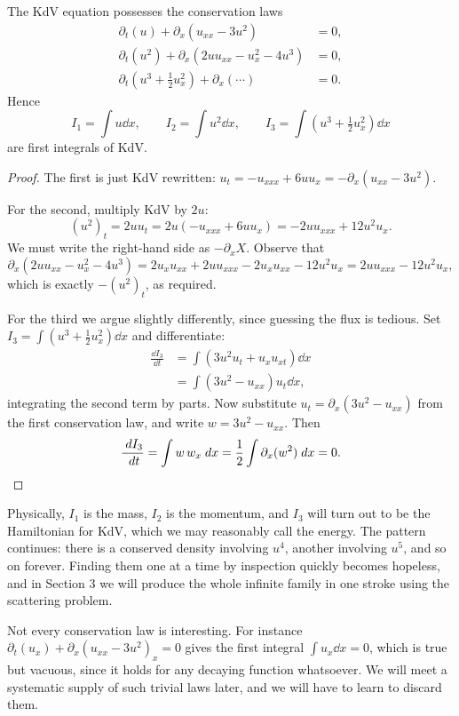 \documentclass[a4paper]{scrartcl}
\begin{document}
\begin{proposition}
	The KdV equation possesses the conservation laws
	\begin{align*}
		\partial_t(u) + \partial_x\left(u_{xx} - 3u^2\right) &= 0,\\
		\partial_t(u^2) + \partial_x\left(2uu_{xx} - u_x^2 - 4u^3\right) &= 0,\\
		\partial_t\left(u^3 + \tfrac{1}{2}u_x^2\right) + \partial_x\left(\cdots\right) &= 0.
	\end{align*}
	Hence
	$$
	I_1 = \int u \dd x, \qquad I_2 = \int u^2\dd x, \qquad I_3 = \int\left(u^3 + \tfrac{1}{2}u_x^2\right)\dd x
	$$
	are first integrals of KdV.
\end{proposition}
\begin{proof}
	The first is just KdV rewritten: $u_t = -u_{xxx} + 6uu_x = -\partial_x(u_{xx} - 3u^2)$.

	For the second, multiply KdV by $2u$:
	$$
	(u^2)_t = 2uu_t = 2u(-u_{xxx} + 6uu_x) = -2uu_{xxx} + 12u^2u_x.
	$$
	We must write the right-hand side as $-\partial_x X$. Observe that
	$$
	\partial_x(2uu_{xx} - u_x^2 - 4u^3) = 2u_xu_{xx} + 2uu_{xxx} - 2u_xu_{xx} - 12u^2u_x = 2uu_{xxx} - 12u^2u_x,
	$$
	which is exactly $-(u^2)_t$, as required.

	For the third we argue slightly differently, since guessing the flux is tedious. Set $I_3 = \int(u^3 + \frac{1}{2}u_x^2)\dd x$ and differentiate:
	\begin{align*}
		\frac{\dd I_3}{\dd t} &= \int\left(3u^2u_t + u_xu_{xt}\right)\dd x\\
		&= \int\left(3u^2 - u_{xx}\right)u_t\dd x,
	\end{align*}
	integrating the second term by parts. Now substitute $u_t = \partial_x(3u^2 - u_{xx})$ from the first conservation law, and write $w = 3u^2 - u_{xx}$. Then
	$$
	\frac{\; d I_3}{\; d t} = \int w\, w_x\; d x = \frac{1}{2}\int\partial_x(w^2)\; d x = 0. \qedhere
	$$
\end{proof}

Physically, $I_1$ is the mass, $I_2$ is the momentum, and $I_3$ will turn out to be the Hamiltonian for KdV, which we may reasonably call the energy. The pattern continues: there is a conserved density involving $u^4$, another involving $u^5$, and so on forever. Finding them one at a time by inspection quickly becomes hopeless, and in Section 3 we will produce the whole infinite family in one stroke using the scattering problem.

\begin{remark}
	Not every conservation law is interesting. For instance $\partial_t(u_x) + \partial_x(u_{xx}-3u^2)_x = 0$ gives the first integral $\int u_x\dd x = 0$, which is true but vacuous, since it holds for any decaying function whatsoever. We will meet a systematic supply of such trivial laws later, and we will have to learn to discard them.
\end{remark}
\end{document}
